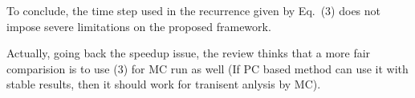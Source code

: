 \begin{authors}
To conclude, the time step used in the recurrence given by Eq.~(3) does not impose severe limitations on the proposed framework.

\begin{actions}
\end{actions}
\end{authors}

\begin{reviewer}
Actually, going back the speedup issue, the review thinks that a more fair comparision is to use (3) for MC run as well (If PC based method can use it with stable results, then it should work for tranisent anlysis by MC).
\end{reviewer}
